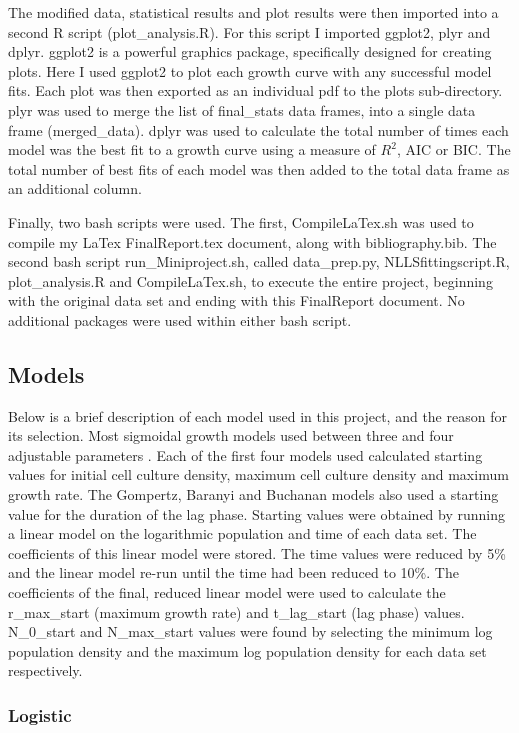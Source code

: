\documentclass[titlepage]{article}
\begin{document}
The modified data, statistical results and plot results were then imported into a second R script (plot\_analysis.R). For this script I imported ggplot2, plyr and dplyr. ggplot2 is a powerful graphics package, specifically designed for creating plots. Here I used ggplot2 to plot each growth curve with any successful model fits. Each plot was then exported as an individual pdf to the plots sub-directory. plyr was used to merge the list of final\_stats data frames, into a single data frame (merged\_data). dplyr was used to calculate the total number of times each model was the best fit to a growth curve using a measure of $R^2$, AIC or BIC. The total number of best fits of each model was then added to the total data frame as an additional column.  

Finally, two bash scripts were used. The first, CompileLaTex.sh was used to compile my LaTex FinalReport.tex document, along with bibliography.bib. The second bash script run\_Miniproject.sh, called data\_prep.py, NLLSfittingscript.R, plot\_analysis.R and CompileLaTex.sh, to execute the entire project, beginning with the original data set and ending with this FinalReport document. No additional packages were used within either bash script.


\subsection{Models}
Below is a brief description of each model used in this project, and the reason for its selection. Most sigmoidal growth models used between three and four adjustable parameters \cite{peleg2011microbial}. Each of the first four models used calculated starting values for initial cell culture density, maximum cell culture density and maximum growth rate. The Gompertz, Baranyi and Buchanan models also used a starting value for the duration of the lag phase.
  Starting values were obtained by running a linear model on the logarithmic population and time of each data set. The coefficients of this linear model were stored. The time values were reduced by 5\% and the linear model re-run until the time had been reduced to 10\%. The coefficients of the final, reduced linear model were used to calculate the r\_max\_start (maximum growth rate) and t\_lag\_start (lag phase) values. N\_0\_start and N\_max\_start values were found by selecting the minimum log population density and the maximum log population density for each data set respectively.
\subsubsection{Logistic}
  
\end{document}

